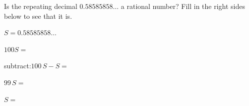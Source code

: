 Is the repeating decimal $0.58585858\dots$ a rational number?  Fill in the right sides below to see that it is.

\newcommand{\xx}[1]{\vspace{#1mm}\medskip\noindent}

\xx{2} $S=0.58585858\dots$

\xx{2} $100S=$

\xx{20} subtract:\quad $100\,S - S=$

\xx{20} $99 \,S=$

\xx{20} $S=$
